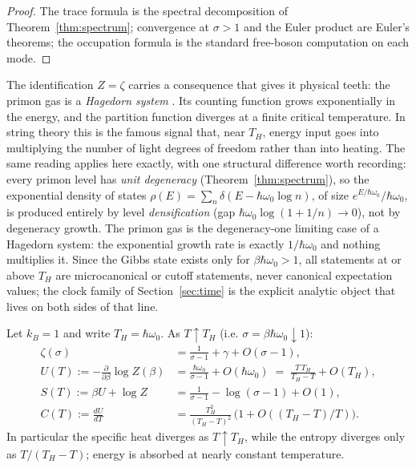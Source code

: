 \begin{proof}
The trace formula is the spectral decomposition of Theorem~\ref{thm:spectrum}; convergence at
$\sigma>1$ and the Euler product are Euler's theorems; the occupation formula is the standard
free-boson computation on each mode.
\end{proof}

The identification $Z=\zeta$ carries a consequence that gives it physical teeth: the primon gas
is a \emph{Hagedorn system} \cite{hagedorn1965}. Its counting function grows exponentially
in the energy, and the partition function diverges at a finite critical temperature. In
string theory this is the famous signal that, near $T_{H}$, energy input goes into multiplying
the number of light degrees of freedom rather than into heating. The same reading applies here
exactly, with one structural difference worth recording: every primon level has \emph{unit
degeneracy} (Theorem~\ref{thm:spectrum}), so the exponential density of states
$\rho(E)=\sum_{n}\delta(E-\hbar\omega_{0}\log n)$, of size $e^{E/\hbar\omega_{0}}/\hbar\omega_{0}$,
is produced entirely by level \emph{densification} (gap $\hbar\omega_{0}\log(1+1/n)\to0$), not
by degeneracy growth. The primon gas is the degeneracy-one limiting case of a Hagedorn system:
the exponential growth rate is exactly $1/\hbar\omega_{0}$ and nothing multiplies it. Since
the Gibbs state exists only for $\beta\hbar\omega_{0}>1$, all statements at or above $T_{H}$ are
microcanonical or cutoff statements, never canonical expectation values; the clock family of
Section~\ref{sec:time} is the explicit analytic object that lives on both sides of that line.

\begin{theorem}\label{thm:hagedorn}
Let $k_{B}=1$ and write $T_{H}=\hbar\omega_{0}$. As $T\uparrow T_{H}$ (i.e.
$\sigma=\beta\hbar\omega_{0}\downarrow 1$):
\begin{align}
\zeta(\sigma)&=\frac{1}{\sigma-1}+\gamma+O(\sigma-1),\\
U(T):=-\frac{\partial}{\partial\beta}\log Z(\beta)
&=\frac{\hbar\omega_{0}}{\sigma-1}+O(\hbar\omega_{0})
\;=\;\frac{T\,T_{H}}{T_{H}-T}+O(T_{H}),\\
S(T):=\beta U+\log Z
&=\frac{1}{\sigma-1}-\log(\sigma-1)+O(1),\\
C(T):=\frac{dU}{dT}
&=\frac{T_{H}^{2}}{(T_{H}-T)^{2}}\,\bigl(1+O((T_{H}-T)/T)\bigr).
\end{align}
In particular the specific heat diverges as $T\uparrow T_{H}$, while the entropy diverges
only as $T/(T_{H}-T)$; energy is absorbed at nearly constant temperature.
\end{theorem}

